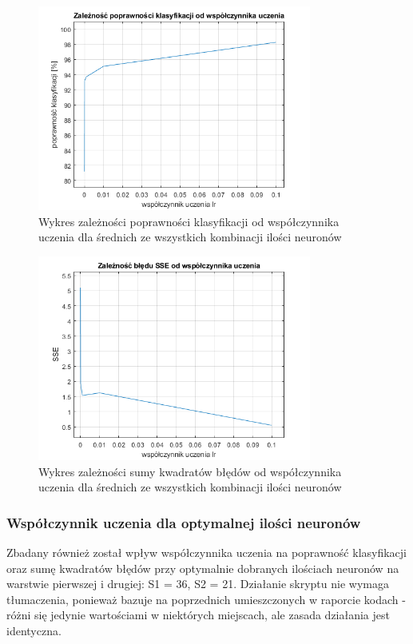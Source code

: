 \documentclass[a4paper, 12pt]{article}
\begin{document}
\begin{figure}[ht]
	\centering
	\includegraphics[width=9cm]{srednia pk}
	\caption{Wykres zależności poprawności klasyfikacji od współczynnika uczenia dla średnich ze wszystkich kombinacji ilości neuronów}
\label{Fig:lr1 sse dane}
\end{figure}
\begin{figure}[ht]
	\centering
	\includegraphics[width=9cm]{srednia sse}
	\caption{Wykres zależności sumy kwadratów błędów od współczynnika uczenia dla średnich ze wszystkich kombinacji ilości neuronów}
\label{Fig:lr1 sse dane}
\end{figure}

\clearpage

\subsubsection{Współczynnik uczenia dla optymalnej ilości neuronów}

Zbadany również został wpływ współczynnika uczenia na poprawność klasyfikacji oraz sumę kwadratów błędów przy optymalnie dobranych ilościach neuronów na warstwie pierwszej i drugiej: S1 = 36, S2 = 21. Działanie skryptu nie wymaga tłumaczenia, ponieważ  bazuje na poprzednich umieszczonych w raporcie kodach - różni się jedynie wartościami w niektórych miejscach, ale zasada działania jest identyczna.
\end{document}

